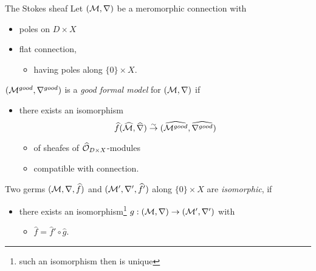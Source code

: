 \begin{frame}[t]{The Stokes sheaf}
  Let $(\mathcal{M},\nabla)$ be a meromorphic connection with
  \begin{itemize}
    \item poles on $D\times X$ 
    \item flat connection, 
      \begin{itemize}
        \item having poles along $\{0\}\times X$.
      \end{itemize}
  \end{itemize}
  \begin{defn}
    $(\mathcal{M}^{good},\nabla^{good})$ is a \emph{good formal model} for
    $(\mathcal{M},\nabla)$ if
    \begin{itemize}
      \item there exists an isomorphism 
        \[
          \widehat f(\widehat{\mathcal{M}},\widehat\nabla)\overset{\sim}{\to}
          (\widehat{\mathcal{M}^{good}},\widehat{\nabla^{good}})
        \]
        \begin{itemize}
          \item of sheafes of $\widehat{\mathcal{O}}_{D\times X}$-modules
          \item compatible with connection.
        \end{itemize}
    \end{itemize}
  \end{defn}
  \begin{defn}
    Two germs $(\mathcal{M},\nabla,\widehat f)$ and $(\mathcal{M}',\nabla',\widehat f')$ along
    $\{0\}\times X$ are \emph{isomorphic}, if
    \begin{itemize}
      \item there exists an isomorphism\footnote{such an isomorphism then is
        unique} $g:(\mathcal{M},\nabla)\to(\mathcal{M}',\nabla')$ with
        \begin{itemize}
          \item $\hat f=\hat f'\circ\hat g$.
        \end{itemize}
    \end{itemize}
  \end{defn}
\end{frame}

